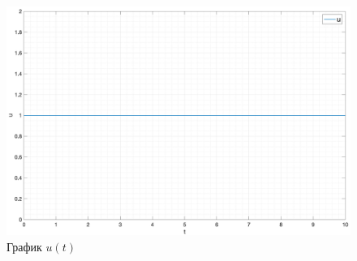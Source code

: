 \begin{figure}
    \centering
    \includegraphics[width=\textwidth]{media/sys1_u(t).png}
    \caption{График $u(t)$}
    \label{fig:ut}
\end{figure}
